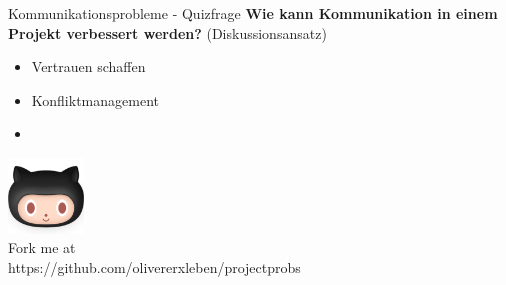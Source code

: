 \documentclass[12pt]{beamer}
\begin{document}
	\begin{frame}{Kommunikationsprobleme - Quizfrage}
		\textbf{Wie kann Kommunikation in einem Projekt verbessert werden?} (Diskussionsansatz)\\
		\begin{itemize}
			\item{Vertrauen schaffen}
			\item{Konfliktmanagement}
			\item{}
		\end{itemize}

	\end{frame}

	\thispagestyle{empty}
	\begin{frame}
		\begin{center}
			\includegraphics[width=0.15\textwidth]{images/github} \\
			Fork me at \\
			https://github.com/olivererxleben/projectprobs
		\end{center}
	\end{frame}
\end{document}

